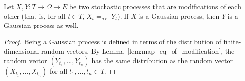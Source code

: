 \begin{lemma}\label{lem:isGaussianProcess_of_modification}
  \leanok
Let $X, Y : T \to \Omega \to E$ be two stochastic processes that are modifications of each other (that is, for all $t \in T$, $X_t =_{a.e.} Y_t$).
If $X$ is a Gaussian process, then $Y$ is a Gaussian process as well.
\end{lemma}

\begin{proof}
Being a Gaussian process is defined in terms of the distribution of finite-dimensional random vectors.
By Lemma~\ref{lem:map_eq_of_modification}, the random vector $(Y_{t_1}, \ldots, Y_{t_n})$ has the same distribution as the random vector $(X_{t_1}, \ldots, X_{t_n})$ for all $t_1, \ldots, t_n \in T$.
\end{proof}
